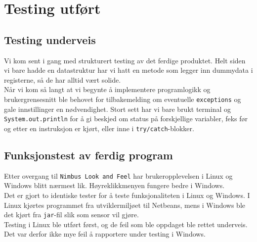 \section{Testing utført}
\subsection{Testing underveis}
Vi kom sent i gang med strukturert testing av det ferdige produktet. Helt siden vi bare hadde en datastruktur har vi hatt en metode som legger inn dummydata i registerne, så de har alltid vært solide. \\
Når vi kom så langt at vi begynte å implementere programlogikk og brukergrensesnitt ble behovet for tilbakemelding om eventuelle \texttt{exceptions} og gale innstillinger en nødvendighet. 
Stort sett har vi bare brukt terminal og \texttt{System.out.println} for å gi beskjed om status på forskjellige variabler, feks før og etter en instruksjon er kjørt, eller inne i \texttt{try/catch}-blokker.

\subsection{Funksjonstest av ferdig program}
Etter overgang til \texttt{Nimbus Look and Feel} har brukeropplevelsen i Linux og Windows blitt nærmest lik. Høyreklikkmenyen fungere bedre i Windows. \\
Det er gjort to identiske tester for å teste funksjonaliteten i Linux og Windows. I Linux kjørtes programmet fra utviklermiljøet til Netbeans, mens i Windows ble det kjørt fra \texttt{jar}-fil slik som sensor vil gjøre. \\
Testing i Linux ble utført først, og de feil som ble oppdaget ble rettet underveis. Det var derfor ikke mye feil å rapportere under testing i Windows.

